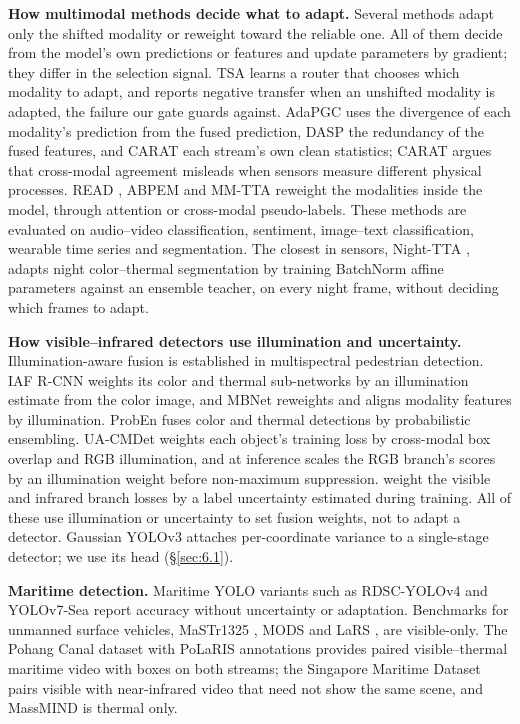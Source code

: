 \documentclass[10pt]{article}
\begin{document}
\textbf{How multimodal methods decide what to adapt.} Several methods adapt only the shifted modality or reweight toward the reliable one. All of them decide from the model's own predictions or features and update parameters by gradient; they differ in the selection signal. TSA \citep{chen2025testtime} learns a router that chooses which modality to adapt, and reports negative transfer when an unshifted modality is adapted, the failure our gate guards against. AdaPGC \citep{xu2026multimodal} uses the divergence of each modality's prediction from the fused prediction, DASP \citep{he2026decoupling} the redundancy of the fused features, and CARAT \citep{mohapatra2026sourcelearned} each stream's own clean statistics; CARAT argues that cross-modal agreement misleads when sensors measure different physical processes. READ \citep{yang2024testtime}, ABPEM \citep{zhao2025attention} and MM-TTA \citep{shin2022mmtta} reweight the modalities inside the model, through attention or cross-modal pseudo-labels. These methods are evaluated on audio--video classification, sentiment, image--text classification, wearable time series and segmentation. The closest in sensors, Night-TTA \citep{liu2024testtime}, adapts night color--thermal segmentation by training BatchNorm affine parameters against an ensemble teacher, on every night frame, without deciding which frames to adapt.

\textbf{How visible--infrared detectors use illumination and uncertainty.} Illumination-aware fusion is established in multispectral pedestrian detection. IAF R-CNN \citep{li2019illuminationaware} weights its color and thermal sub-networks by an illumination estimate from the color image, and MBNet \citep{zhou2020improving} reweights and aligns modality features by illumination. ProbEn \citep{chen2022multimodal} fuses color and thermal detections by probabilistic ensembling. UA-CMDet \citep{sun2022dronebased} weights each object's training loss by cross-modal box overlap and RGB illumination, and at inference scales the RGB branch's scores by an illumination weight before non-maximum suppression. \citet{zhao2024uncertaintyaware} weight the visible and infrared branch losses by a label uncertainty estimated during training. All of these use illumination or uncertainty to set fusion weights, not to adapt a detector. Gaussian YOLOv3 \citep{choi2019gaussian} attaches per-coordinate variance to a single-stage detector; we use its head (\S\ref{sec:6.1}).

\textbf{Maritime detection.} Maritime YOLO variants such as RDSC-YOLOv4 \citep{liu2021sea} and YOLOv7-Sea \citep{zhao2023yolov7sea} report accuracy without uncertainty or adaptation. Benchmarks for unmanned surface vehicles, MaSTr1325 \citep{bovcon2019the}, MODS \citep{bovcon2022mods} and LaRS \citep{zust2023lars}, are visible-only. The Pohang Canal dataset \citep{chung2023pohang} with PoLaRIS annotations \citep{choi2025polaris} provides paired visible--thermal maritime video with boxes on both streams; the Singapore Maritime Dataset \citep{prasad2017video} pairs visible with near-infrared video that need not show the same scene, and MassMIND \citep{nirgudkar2023massmind} is thermal only.
\end{document}
